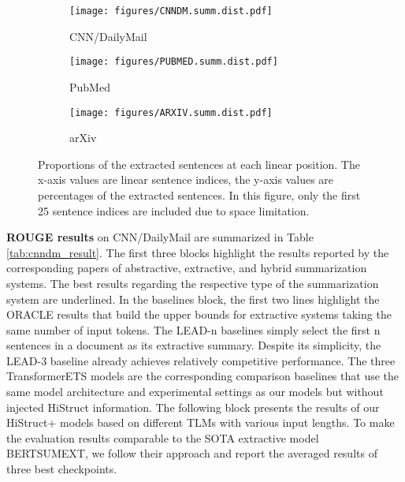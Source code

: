 \documentclass[11pt]{article}
\begin{document}
\begin{figure}[ht]
\begin{subfigure}{1\linewidth}
  \centering
  \texttt{[image: figures/CNNDM.summ.dist.pdf]}
  \caption[CNN/DailyMail: distribution of the extracted sentences]{CNN/DailyMail}\label{fig:cnndm_dist_roberta1024}
\end{subfigure}
\begin{subfigure}{1\linewidth}
  \centering
  \texttt{[image: figures/PUBMED.summ.dist.pdf]}
  \caption{PubMed}\label{fig:pubmed_dist_longformer15000}
\end{subfigure}
\begin{subfigure}{1\linewidth}
  \centering
  \texttt{[image: figures/ARXIV.summ.dist.pdf]}
  \caption[arXiv: distribution of the extracted sentences]{arXiv}\label{fig:arxiv_dist_longformer28000}
\end{subfigure}
\caption{Proportions of the extracted sentences at each linear position. The x-axis values are linear sentence indices, the y-axis values are percentages of the extracted sentences. In this figure, only the first 25 sentence indices are included due to space limitation.}
\label{fig:extracted summaries}
\end{figure}






\textbf{ROUGE results} on CNN/DailyMail are summarized in Table \ref{tab:cnndm_result}. 
The first three blocks highlight the results reported by the corresponding papers of abstractive, extractive, and hybrid summarization systems. The best results regarding the respective type of the summarization system are underlined. 
In the baselines block, the first two lines highlight the ORACLE results that build the upper bounds for extractive systems taking the same number of input tokens. The LEAD-n baselines simply select the first n sentences in a document as its extractive summary. Despite its simplicity, the LEAD-3 baseline already achieves relatively competitive performance.
The three TransformerETS models are the corresponding comparison baselines that use the same model architecture and experimental settings as our models but without injected HiStruct information.
The following block presents the results of our HiStruct+ models based on different TLMs with various input lengths. To make the evaluation results comparable to the SOTA extractive model BERTSUMEXT, we follow their approach and report the averaged results of three best checkpoints. 
\end{document}
